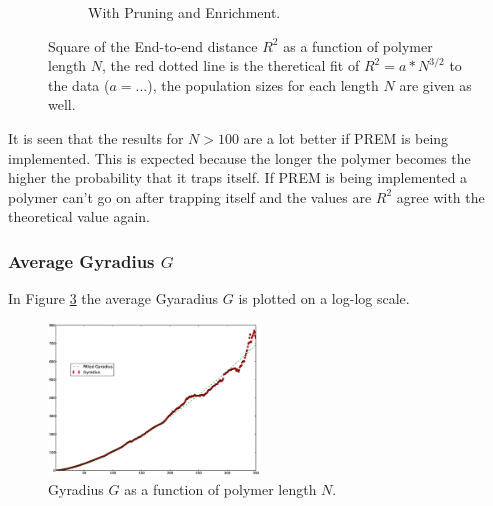 \begin{figure}[htb]
\begin{subfigure}[b]{0.45\textwidth}
                \caption{With Pruning and Enrichment.}
                \label{fig:etoe_prem}
        \end{subfigure}
        \caption{Square of the End-to-end distance $R^2$ as a function of polymer length $N$, the red dotted line is the theretical fit of $R^2=a*N^{3/2}$ to the data ($a= ...$), the population sizes for each length $N$ are given as well.}
        \label{fig:etoe}
\end{figure}

It is seen that the results for $N>100$ are a lot better if PREM is being implemented. This is expected because the longer the polymer becomes the higher the probability that it traps itself. If PREM is being implemented a polymer can't go on after trapping itself and the values are $R^2$ agree with the theoretical value again. 


\subsubsection*{Average Gyradius $G$}

In Figure \ref{fig:gyradius} the average Gyaradius $G$ is plotted on a log-log scale.


\begin{figure}[ht!]
\centering
\includegraphics[width=0.5\textwidth]{figures/N350_Gyradius_PERM1}
\caption{Gyradius $G$ as a function of polymer length $N$.}
\label{fig:gyradius}
\end{figure}